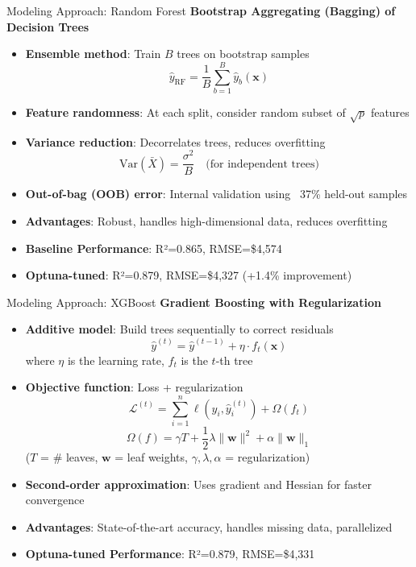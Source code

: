 \documentclass[10pt]{beamer}
\begin{document}
\begin{frame}{Modeling Approach: Random Forest}
\textbf{Bootstrap Aggregating (Bagging) of Decision Trees}
\begin{itemize}
\item \textbf{Ensemble method}: Train $B$ trees on bootstrap samples
  $$\hat{y}_{\text{RF}} = \frac{1}{B} \sum_{b=1}^{B} \hat{y}_b(\mathbf{x})$$
\item \textbf{Feature randomness}: At each split, consider random subset of $\sqrt{p}$ features
\item \textbf{Variance reduction}: Decorrelates trees, reduces overfitting
  $$\text{Var}(\bar{X}) = \frac{\sigma^2}{B} \quad \text{(for independent trees)}$$
\item \textbf{Out-of-bag (OOB) error}: Internal validation using ~37\% held-out samples
\item \textbf{Advantages}: Robust, handles high-dimensional data, reduces overfitting
\item \textbf{Baseline Performance}: R²=0.865, RMSE=\$4,574
\item \textbf{Optuna-tuned}: R²=0.879, RMSE=\$4,327 (+1.4\% improvement)
\end{itemize}
\end{frame}

\begin{frame}{Modeling Approach: XGBoost}
\textbf{Gradient Boosting with Regularization}
\begin{itemize}
\item \textbf{Additive model}: Build trees sequentially to correct residuals
  $$\hat{y}^{(t)} = \hat{y}^{(t-1)} + \eta \cdot f_t(\mathbf{x})$$
  where $\eta$ is the learning rate, $f_t$ is the $t$-th tree
\item \textbf{Objective function}: Loss + regularization
  $$\mathcal{L}^{(t)} = \sum_{i=1}^{n} \ell(y_i, \hat{y}_i^{(t)}) + \Omega(f_t)$$
  $$\Omega(f) = \gamma T + \frac{1}{2}\lambda \|\mathbf{w}\|^2 + \alpha \|\mathbf{w}\|_1$$
  ($T$ = \# leaves, $\mathbf{w}$ = leaf weights, $\gamma, \lambda, \alpha$ = regularization)
\item \textbf{Second-order approximation}: Uses gradient and Hessian for faster convergence
\item \textbf{Advantages}: State-of-the-art accuracy, handles missing data, parallelized
\item \textbf{Optuna-tuned Performance}: R²=0.879, RMSE=\$4,331
\end{itemize}
\end{frame}
\end{document}
